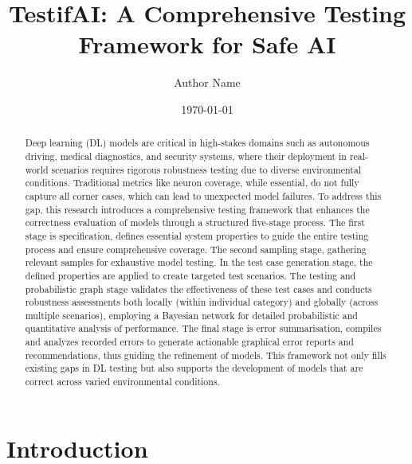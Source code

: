 \documentclass[10pt, conference, a4paper, final]{IEEEtran}
\title{TestifAI: A Comprehensive Testing Framework for Safe AI}
\author{Author Name}
\date{\today}
\begin{document}
\maketitle

\begin{abstract}

    Deep learning (DL) models are critical in high-stakes domains such as autonomous driving, medical diagnostics, and security systems, where their deployment in real-world scenarios requires rigorous robustness testing due to diverse environmental conditions. Traditional metrics like neuron coverage, while essential, do not fully capture all corner cases, which can lead to unexpected model failures. To address this gap, this research introduces a comprehensive testing framework that enhances the correctness evaluation of models through a structured five-stage process. The first stage is specification, defines essential system properties to guide the entire testing process and ensure comprehensive coverage. The second sampling stage, gathering relevant samples for exhaustive model testing. In the test case generation stage, the defined properties are applied to create targeted test scenarios. The testing and probabilistic graph stage validates the effectiveness of these test cases and conducts robustness assessments both locally (within individual category) and globally (across multiple scenarios), employing a Bayesian network for detailed probabilistic and quantitative analysis of performance. The final stage is error summarisation, compiles and analyzes recorded errors to generate actionable graphical error reports and recommendations, thus guiding the refinement of models. This framework not only fills existing gaps in DL testing but also supports the development of models that are correct across varied environmental conditions.
\end{abstract}


\section{Introduction}






\end{document}
